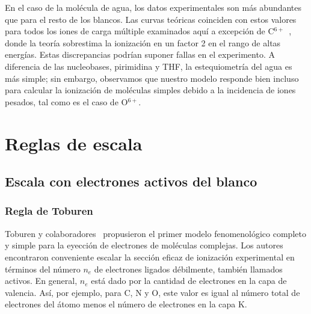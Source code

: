 En el caso de la molécula de agua, los datos experimentales son más 
abundantes que para el resto de los blancos. Las curvas teóricas 
coinciden con estos valores~\cite{Luna2007,Bolorizadeh86,H_Rudd85,
Ohsawa05,He_Rudd85,toburen80,Bhattacharjee:16} para todos los iones de 
carga múltiple examinados aquí a excepción de
C$^{6+}$~\cite{DalCappello:09,Bhattacharjee:17}, donde la teoría 
sobrestima la ionización en un factor 2 en el rango de altas energías. 
Estas discrepancias podrían suponer fallas en el experimento. 
A diferencia de las nucleobases, pirimidina y THF, la estequiometría del 
agua es más simple; sin embargo, observamos que nuestro modelo responde 
bien incluso para calcular la ionización de moléculas simples debido a 
la incidencia de iones pesados, tal como es el caso de O$^{6+}$.

\section{Reglas de escala}
\label{sec:scaling}

\subsection{Escala con electrones activos del blanco}
\label{subsec:ne_scaling}

\subsubsection{Regla de Toburen}
\label{subsec:toburen}

Toburen y colaboradores~\cite{Toburen:75,Toburen:76} propusieron el 
primer modelo fenomenológico completo y simple para la eyección de 
electrones de moléculas complejas. Los autores encontraron conveniente 
escalar la sección eficaz de ionización experimental en términos del 
número $n_e$ de electrones ligados débilmente, también llamados activos. 
En general, $n_e$ está dado por la cantidad de electrones en la capa de 
valencia. Así, por ejemplo, para C, N y O, este valor es igual al número 
total de electrones del átomo menos el número de electrones en la capa 
K. 

